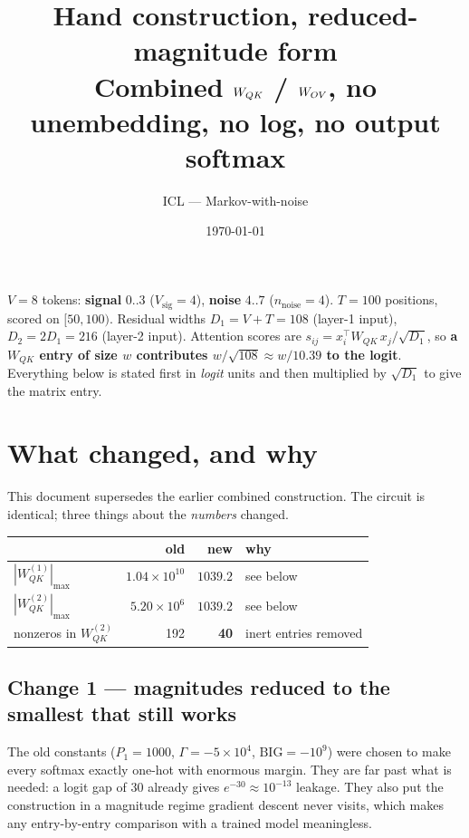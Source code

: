 \documentclass[11pt]{article}
\title{\textbf{Hand construction, reduced-magnitude form}\\[2pt]
\large Combined $\Wqk$ / $W_{OV}$, no unembedding, no log, no output softmax}
\author{ICL --- Markov-with-noise}
\date{\today}
\newcommand{\Wqk}{W_{QK}}
\newcommand{\Vsig}{V_{\mathrm{sig}}}
\newcommand{\nnoise}{n_{\mathrm{noise}}}
\begin{document}
\maketitle

\begin{conventionbox}
$V=8$ tokens: \textbf{signal} $0..3$ ($\Vsig=4$), \textbf{noise} $4..7$ ($\nnoise=4$).
$T=100$ positions, scored on $[50,100)$. Residual widths
$D_1=V+T=108$ (layer-1 input), $D_2=2D_1=216$ (layer-2 input).
Attention scores are $s_{ij}=x_i^\top \Wqk\, x_j/\sqrt{D_1}$, so \textbf{a $\Wqk$ entry of size $w$
contributes $w/\sqrt{108}\approx w/10.39$ to the logit}. Everything below is stated first in
\emph{logit} units and then multiplied by $\sqrt{D_1}$ to give the matrix entry.
\end{conventionbox}

\section{What changed, and why}

This document supersedes the earlier combined construction. The circuit is identical; three
things about the \emph{numbers} changed.

\begin{center}\small
\begin{tabular}{@{}lrrl@{}}
\toprule
& old & new & why \\
\midrule
$|\Wqk^{(1)}|_{\max}$ & $1.04\times10^{10}$ & $1039.2$ & see below \\
$|\Wqk^{(2)}|_{\max}$ & $5.20\times10^{6}$  & $1039.2$ & see below \\
nonzeros in $\Wqk^{(2)}$ & 192 & \textbf{40} & inert entries removed \\
\bottomrule
\end{tabular}
\end{center}

\subsection{Change 1 --- magnitudes reduced to the smallest that still works}

The old constants ($P_1=1000$, $\Gamma=-5\times10^{4}$, $\text{BIG}=-10^{9}$) were chosen to make
every softmax exactly one-hot with enormous margin. They are far past what is needed: a logit gap
of $30$ already gives $e^{-30}\approx10^{-13}$ leakage. They also put the construction in a
magnitude regime gradient descent never visits, which makes any entry-by-entry comparison with a
trained model meaningless.
\end{document}
